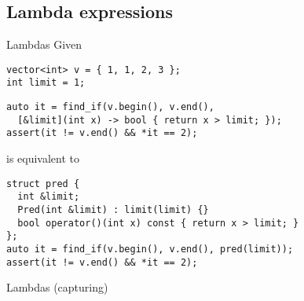 \documentclass[presentation]{beamer}
\begin{document}

\subsection{Lambda expressions}

\begin{frame}[fragile,label={sec:orgheadline4}]{Lambdas}
  Given
\begin{verbatim}
vector<int> v = { 1, 1, 2, 3 };
int limit = 1;
\end{verbatim}
\begin{verbatim}
auto it = find_if(v.begin(), v.end(),
  [&limit](int x) -> bool { return x > limit; });
assert(it != v.end() && *it == 2);
\end{verbatim}
  is equivalent to
\begin{verbatim}
struct pred {
  int &limit;
  Pred(int &limit) : limit(limit) {}
  bool operator()(int x) const { return x > limit; }
};
auto it = find_if(v.begin(), v.end(), pred(limit));
assert(it != v.end() && *it == 2);
\end{verbatim}
\end{frame}
\begin{frame}[fragile]{Lambdas (capturing)}
\end{frame}
\end{document}
